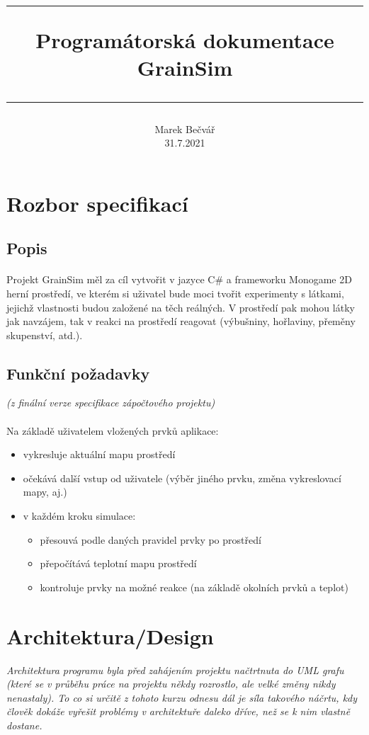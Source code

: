 \documentclass[a4paper, 12pt]{article}
\title{
        \vspace{1in}
        \rule{\linewidth}{0.5pt}
		\usefont{OT1}{bch}{b}{n}
        \huge Programátorská dokumentace \\GrainSim\\
        \vspace{-10pt}
        \rule{\linewidth}{1pt}
}
\author{
		\normalfont\normalsize
        Marek Bečvář\\[-3pt]\normalsize
        31.7.2021
}
\date{}
\begin{document}
\maketitle 
\newpage

\tableofcontents
\newpage

\section{Rozbor specifikací} 
\subsection{Popis}
\paragraph{} 
Projekt GrainSim měl za cíl vytvořit v jazyce C\# a frameworku Monogame 2D
herní prostředí, ve kterém si uživatel bude moci tvořit experimenty s látkami, 
jejichž vlastnosti budou založené na těch reálných. V prostředí pak mohou
látky jak navzájem, tak v reakci na prostředí reagovat (výbušniny, hořlaviny,
přeměny skupenství, atd.).

\subsection{Funkční požadavky}
\emph{(z finální verze specifikace zápočtového projektu)}\\
\\
Na základě uživatelem vložených prvků aplikace:
\vspace{-5px}
\begin{itemize}
    \item vykresluje aktuální mapu prostředí 
    \item očekává další vstup od uživatele (výběr jiného prvku, změna
        vykreslovací mapy, aj.)
    \item v každém kroku simulace:
        \begin{itemize}
            \item přesouvá podle daných pravidel prvky po prostředí
            \item přepočítává teplotní mapu prostředí
            \item kontroluje prvky na možné reakce (na základě okolních prvků a
            teplot)
        \end{itemize}
\end{itemize}

\newpage
\section{Architektura/Design}
\small{\emph{Architektura programu byla před zahájením projektu načtrtnuta do
        UML grafu (které se v průběhu práce na projektu někdy rozrostlo, ale 
        velké změny nikdy nenastaly). To co si určitě z tohoto kurzu odnesu dál 
        je síla takového náčrtu, kdy člověk dokáže vyřešit problémy v architektuře 
daleko dříve, než se k nim vlastně dostane.}}
\end{document}
